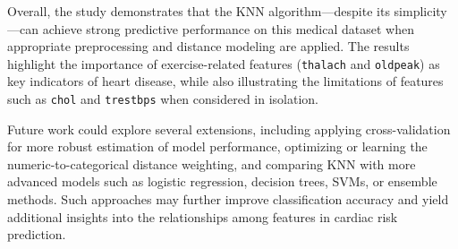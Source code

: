 Overall, the study demonstrates that the KNN algorithm—despite its simplicity—can achieve strong predictive
performance on this medical dataset when appropriate preprocessing and distance modeling are applied. The
results highlight the importance of exercise-related features (\texttt{thalach} and \texttt{oldpeak}) as
key indicators of heart disease, while also illustrating the limitations of features such as \texttt{chol}
and \texttt{trestbps} when considered in isolation.

Future work could explore several extensions, including applying cross-validation for more robust estimation
of model performance, optimizing or learning the numeric-to-categorical distance weighting, and comparing
KNN with more advanced models such as logistic regression, decision trees, SVMs, or ensemble methods.
Such approaches may further improve classification accuracy and yield additional insights into the
relationships among features in cardiac risk prediction.